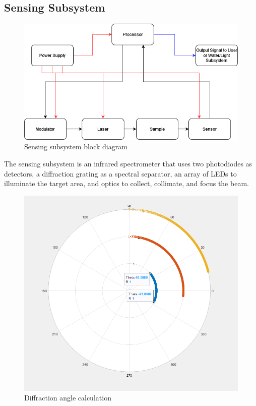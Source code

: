 \subsection{Sensing Subsystem}
\begin{figure}[H]
    \caption{Sensing subsystem block diagram}
    \centering
    \includegraphics[width=\textwidth]{images/IRSensorBlockDiagram.png}
\end{figure}


The sensing subsystem is an infrared spectrometer that uses two photodiodes as detectors, a diffraction grating as a spectral separator, an array of LEDs to illuminate the target area, and optics to collect, collimate, and focus the beam.


\begin{figure}[H]
    \caption{Diffraction angle calculation}
    \centering
    \includegraphics[width=\textwidth]{images/DiffractionAngleCalculator.png}
\end{figure}

